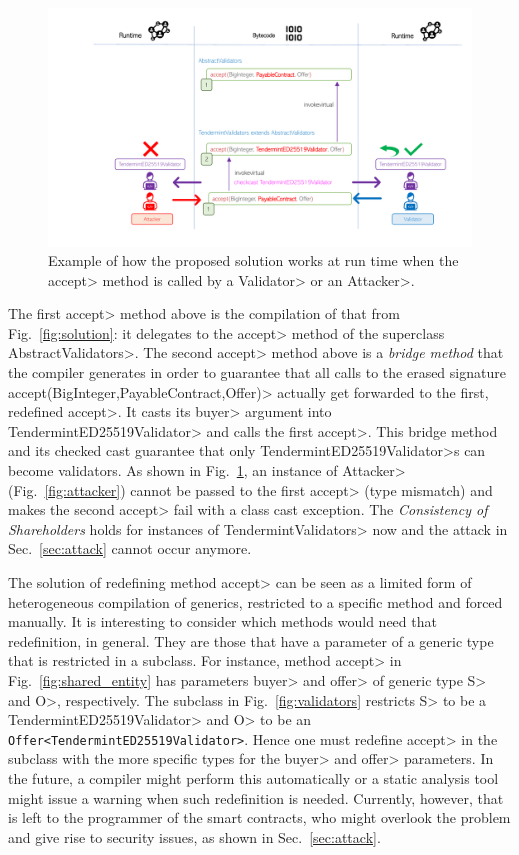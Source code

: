 \begin{figure}[ht]
\centering
\includegraphics[width=0.9\linewidth]{figures/solution}
\caption{Example of how the proposed solution works at run time when the \<accept> method is called by a \<Validator> or an \<Attacker>.}
\label{figure.solution}
\end{figure}

\noindent
The first \<accept> method above is the compilation of that from Fig.~\ref{fig:solution}:
it delegates to the \<accept> method of the superclass \<AbstractValidators>. The second
\<accept> method above is a \emph{bridge method} that the compiler generates in order to guarantee
that all calls to the erased signature \<accept(BigInteger,PayableContract,Offer)> actually
get forwarded to the first, redefined \<accept>. It casts its \<buyer> argument
into \<TendermintED25519Validator> and calls the first \<accept>. This
bridge method and its checked cast guarantee that only \<TendermintED25519Validator>s
can become validators. As shown in Fig.~\ref{figure.solution},
an instance of \<Attacker> (Fig.~\ref{fig:attacker})
cannot be passed to the first \<accept> (type mismatch) and makes the second \<accept>
fail with a class cast exception. The \emph{Consistency of Shareholders} holds
for instances of \<TendermintValidators> now and the attack in Sec.~\ref{sec:attack} cannot occur
anymore.

The solution of redefining method \<accept> can be seen as a limited form of heterogeneous
compilation of generics, restricted to a specific method and forced manually.
It is interesting to consider which methods
would need that redefinition, in general. They are those that have a parameter of a generic type
that is restricted in a subclass. For instance, method \<accept> in
Fig.~\ref{fig:shared_entity} has parameters \<buyer> and \<offer> of generic type
\<S> and \<O>, respectively. The subclass in Fig.~\ref{fig:validators} restricts
\<S> to be a \<TendermintED25519Validator> and \<O> to be
an {\codesize\texttt{Offer<TendermintED25519Validator>}}. Hence one must redefine
\<accept> in the subclass with the more specific types for the \<buyer> and \<offer>
parameters. In the future, a compiler might perform this automatically or a static analysis
tool might issue a warning when such redefinition is needed. Currently, however, that is
left to the programmer of the smart contracts, who might overlook the problem
and give rise to security issues, as shown in Sec.~\ref{sec:attack}.


